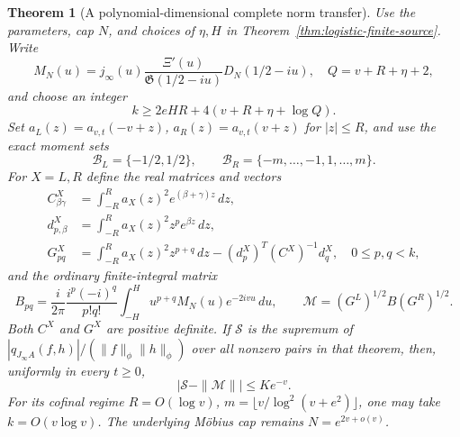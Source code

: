\documentclass[11pt]{article}
\newtheorem{theorem}{Theorem}
\theoremstyle{remark}\newtheorem{remark}[theorem]{Remark}
\begin{document}
\begin{theorem}[A polynomial-dimensional complete norm transfer]
\label{thm:complete-source-matrices}
Use the parameters, cap \(N\), and choices of \(\eta,H\) in
Theorem~\ref{thm:logistic-finite-source}. Write
\[
 M_N(u)=j_\infty(u)\frac{\Xi'(u)}{\mathfrak G(1/2-iu)}
                         D_N(1/2-iu),\quad Q=v+R+\eta+2,
\]
and choose an integer
\[
 k\ge 2eHR+4(v+R+\eta+\log Q).
                                                               \tag{CM1}
\]
Set \(a_L(z)=a_{v,t}(-v+z)\), \(a_R(z)=a_{v,t}(v+z)\)
for \(|z|\le R\), and use the exact moment sets
\[
 \mathcal B_L=\{-1/2,1/2\},\qquad
 \mathcal B_R=\{-m,\ldots,-1,1,\ldots,m\}.
                                                               \tag{CM2}
\]
For \(X=L,R\) define the real matrices and vectors
\[
 \begin{split}
 C^X_{\beta\gamma}
   &=\int_{-R}^R a_X(z)^2e^{(\beta+\gamma)z}\,dz,\\
 d^X_{p,\beta}
   &=\int_{-R}^R a_X(z)^2z^pe^{\beta z}\,dz,\\
 G^X_{pq}
   &=\int_{-R}^R a_X(z)^2z^{p+q}\,dz
                    -(d^X_p)^T(C^X)^{-1}d^X_q,\quad 0\le p,q<k,
 \end{split}                                                   \tag{CM3}
\]
and the ordinary finite-integral matrix
\[
 B_{pq}=\frac{i}{2\pi}\frac{i^p(-i)^q}{p!q!}
       \int_{-H}^H u^{p+q}M_N(u)e^{-2ivu}\,du,\qquad
 \mathcal M=(G^L)^{1/2}B(G^R)^{1/2}.                \tag{CM4}
\]
Both \(C^X\) and \(G^X\) are positive definite. If \(\mathcal S\)
is the supremum of
\(|q_{J_\infty A}(f,h)|/(\|f\|_\phi\|h\|_\phi)\)
over all nonzero pairs in that theorem, then, uniformly in
every \(t\ge0\),
\[
                  |\mathcal S-\|\mathcal M\||\le K e^{-v}.
                                                               \tag{CM5}
\]
For its cofinal regime \(R=O(\log v)\),
\(m=\lfloor v/\log^2(v+e^2)\rfloor\), one may take
\(k=O(v\log v)\). The underlying Möbius cap remains
\(N=e^{2v+o(v)}\).
\end{theorem}
\end{document}
